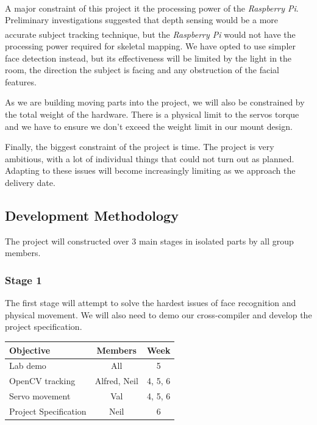 \documentclass[11pt,a4paper,titlepage]{report}
\newcommand{\rpi}{\textit{Raspberry Pi\textsuperscript{\textregistered}}}
\begin{document}
A major constraint of this project it the processing power of the \rpi. Preliminary investigations suggested that depth sensing would be a more accurate subject tracking technique, but the \rpi\xspace would not have the processing power required for skeletal mapping. We have opted to use simpler face detection instead, but its effectiveness will be limited by the light in the room, the direction the subject is facing and any obstruction of the facial features.

As we are building moving parts into the project, we will also be constrained by the total weight of the hardware. There is a physical limit to the servos torque and we have to ensure we don't exceed the weight limit in our mount design.

Finally, the biggest constraint of the project is time. The project is very ambitious, with a lot of individual things that could not turn out as planned. Adapting to these issues will become increasingly limiting as we approach the delivery date.


\subsection{Development Methodology}

The project will constructed over 3 main stages in isolated parts by all group members. 


\subsubsection{Stage 1}

The first stage will attempt to solve the hardest issues of face recognition and physical movement. We will also need to demo our cross-compiler and develop the project specification.

\begin{table}[H]
\begin{tabular}{|l|c|c|}
    \hline
    \textbf{Objective} & \textbf{Members} & \textbf{Week} \\ \hline
    
    Lab demo & All & 5 \\ \hline
    OpenCV tracking & Alfred, Neil & 4, 5, 6 \\ \hline
    Servo movement & Val & 4, 5, 6 \\ \hline
    Project Specification & Neil & 6 \\ \hline

\end{tabular}
\end{table}
\end{document}
